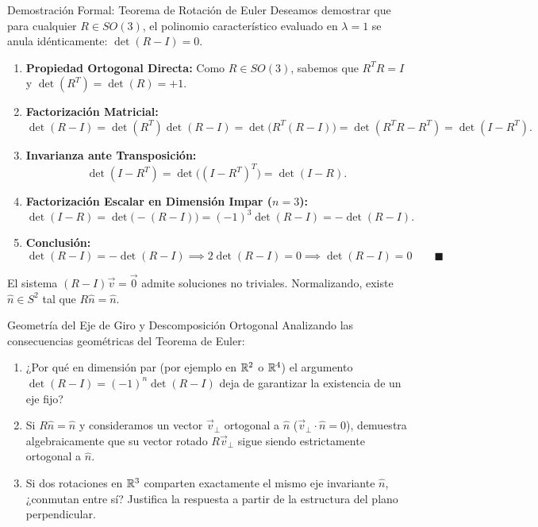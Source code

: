 \documentclass[10pt,aspectratio=169]{beamer}
\begin{document}
\begin{frame}{Demostración Formal: Teorema de Rotación de Euler}
  \footnotesize
  Deseamos demostrar que para cualquier $R \in SO(3)$, el polinomio característico evaluado en $\lambda = 1$ se anula idénticamente: $\det(R - I) = 0$.
  \vspace{0.15cm}

  \begin{enumerate}\itemsep4pt
    \item \textbf{Propiedad Ortogonal Directa:}
    Como $R \in SO(3)$, sabemos que $R^T R = I$ y $\det(R^T) = \det(R) = +1$.
    \item \textbf{Factorización Matricial:}
    \[
    \det(R - I) = \det(R^T)\det(R - I) = \det\big(R^T(R - I)\big) = \det(R^T R - R^T) = \det(I - R^T).
    \]
    \item \textbf{Invarianza ante Transposición:}
    \[
    \det(I - R^T) = \det\big((I - R^T)^T\big) = \det(I - R).
    \]
    \item \textbf{Factorización Escalar en Dimensión Impar ($n = 3$):}
    \[
    \det(I - R) = \det\big(-(R - I)\big) = (-1)^3 \det(R - I) = -\det(R - I).
    \]
    \item \textbf{Conclusión:}
    \[
    \det(R - I) = -\det(R - I) \implies 2\det(R - I) = 0 \implies \boxed{\det(R - I) = 0} \qquad \blacksquare
    \]
  \end{enumerate}
  \vspace{0.05cm}
  {\scriptsize El sistema $(R - I)\vec{v} = \vec{0}$ admite soluciones no triviales. Normalizando, existe $\hat{n} \in S^2$ tal que $R\hat{n} = \hat{n}$.}
\end{frame}

\begin{frame}{Geometría del Eje de Giro y Descomposición Ortogonal}
  \vspace{0.2cm}
  Analizando las consecuencias geométricas del Teorema de Euler:
  \vspace{0.3cm}
  \begin{enumerate}\itemsep14pt
    \item ¿Por qué en dimensión par (por ejemplo en $\mathbb{R}^2$ o $\mathbb{R}^4$) el argumento $\det(R-I) = (-1)^n \det(R-I)$ deja de garantizar la existencia de un eje fijo?
    \item Si $R\hat{n} = \hat{n}$ y consideramos un vector $\vec{v}_\perp$ ortogonal a $\hat{n}$ ($\vec{v}_\perp \cdot \hat{n} = 0$), demuestra algebraicamente que su vector rotado $R\vec{v}_\perp$ sigue siendo estrictamente ortogonal a $\hat{n}$.
    \item Si dos rotaciones en $\mathbb{R}^3$ comparten exactamente el mismo eje invariante $\hat{n}$, ¿conmutan entre sí? Justifica la respuesta a partir de la estructura del plano perpendicular.
  \end{enumerate}
\end{frame}
\end{document}
